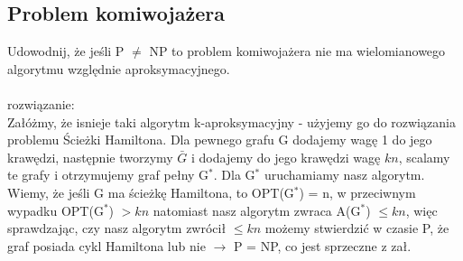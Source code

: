 \documentclass{article}
\begin{document}
\subsection*{Problem komiwojażera}
Udowodnij, że jeśli P $\ne$ NP to problem komiwojażera nie ma wielomianowego algorytmu względnie aproksymacyjnego. \\\\rozwiązanie:\\
Załóżmy, że isnieje taki algorytm k-aproksymacyjny - użyjemy go do rozwiązania problemu Ścieżki Hamiltona. 
Dla pewnego grafu G dodajemy wagę 1 do jego krawędzi, następnie tworzymy $\bar{G}$
i dodajemy do jego krawędzi wagę $kn$, scalamy te grafy i otrzymujemy graf pełny G$^*$. Dla G$^*$ uruchamiamy nasz algorytm.
Wiemy, że jeśli G ma ścieżkę Hamiltona, to OPT(G$^*$) = n, w przeciwnym wypadku OPT(G$^*$) $> kn$ natomiast nasz algorytm zwraca A(G$^*$) $\leq kn$,
więc sprawdzając, czy nasz algorytm zwrócił $\leq kn$ możemy stwierdzić w czasie P, że graf posiada cykl Hamiltona lub nie $\rightarrow$ P = NP, co jest sprzeczne z zał.
\end{document}
